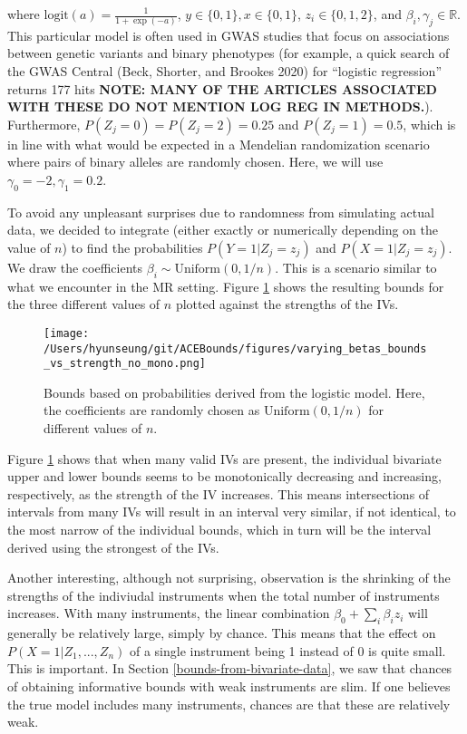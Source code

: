 \documentclass[
]{article}
\theoremstyle{plain}
\begin{document}
{where \(\text{logit}(a) = \frac{1}{1 + \exp(-a)}\), \(y \in \{0,1\}, x \in \{0,1\}\), \(z_i \in \{0, 1, 2\}\), and \(\beta_i, \gamma_j \in \mathbb{R}\). This particular model is often used in GWAS studies that focus on associations between genetic variants and binary phenotypes (for example, a quick search of the GWAS Central (Beck, Shorter, and Brookes 2020) for ``logistic regression'' returns 177 hits \textbf{NOTE: MANY OF THE ARTICLES ASSOCIATED WITH THESE DO NOT MENTION LOG REG IN METHODS.}). Furthermore, \(P(Z_j = 0) = P(Z_j = 2) = 0.25\) and \(P(Z_j = 1) = 0.5\), which is in line with what would be expected in a Mendelian randomization scenario where pairs of binary alleles are randomly chosen. Here, we will use \(\gamma_0 = -2, \gamma_1 = 0.2\).

To avoid any unpleasant surprises due to randomness from simulating actual data, we decided to integrate (either exactly or numerically depending on the value of \(n\)) to find the probabilities \(P(Y = 1 | Z_j = z_j)\) and \(P(X = 1 | Z_j = z_j)\). We draw the coefficients \(\beta_i \sim \text{Uniform}(0, 1/n)\). This is a scenario similar to what we encounter in the MR setting. Figure \ref{fig:bounds_vs_strength_many_IVs_varying_betas} shows the resulting bounds for the three different values of \(n\) plotted against the strengths of the IVs.

\begin{figure}[H]
  \center
  \texttt{[image: /Users/hyunseung/git/ACEBounds/figures/varying\_betas\_bounds\_vs\_strength\_no\_mono.png]}
  \caption{Bounds based on probabilities derived from the logistic model. Here, the coefficients are randomly chosen as $\text{Uniform}(0, 1/n)$ for different values of $n$.}  
  \label{fig:bounds_vs_strength_many_IVs_varying_betas}
\end{figure}

Figure \ref{fig:bounds_vs_strength_many_IVs_varying_betas} shows that when many valid IVs are present, the individual bivariate upper and lower bounds seems to be monotonically decreasing and increasing, respectively, as the strength of the IV increases. This means intersections of intervals from many IVs will result in an interval very similar, if not identical, to the most narrow of the individual bounds, which in turn will be the interval derived using the strongest of the IVs.

Another interesting, although not surprising, observation is the shrinking of the strengths of the indiviudal instruments when the total number of instruments increases. With many instruments, the linear combination \(\beta_0 + \sum_i \beta_i z_i\) will generally be relatively large, simply by chance. This means that the effect on \(P(X = 1 | Z_1, ..., Z_n)\) of a single instrument being 1 instead of 0 is quite small. This is important. In Section \ref{bounds-from-bivariate-data}, we saw that chances of obtaining informative bounds with weak instruments are slim. If one believes the true model includes many instruments, chances are that these are relatively weak.

}
\end{document}
